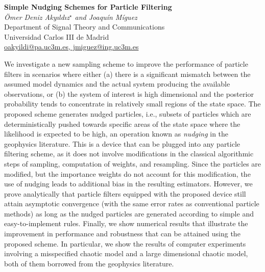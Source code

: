 \documentclass[12pt]{article}
\newcommand{\postertitle}[1]{{\Large\bf #1}\\[12pt]}
\newcommand{\authors}[1]{\emph{#1}\\}
\newcommand{\affiliations}[1]{{#1}\\}
\newcommand{\contacts}[1]{{#1}}
\begin{document}
\begin{center}
\vspace*{0.5cm}
%
\postertitle{Simple Nudging Schemes for Particle Filtering}
%
\authors{\"Omer Deniz Aky{\i}ld{\i}z$^\star$ and Joaqu\'in M\'iguez} %
% 
\affiliations{Department of Signal Theory and Communications \\ Universidad Carlos III de Madrid}
%
\contacts{\url{oakyildi@pa.uc3m.es, jmiguez@ing.uc3m.es}} %
%
\vspace*{0.3cm}
\end{center}

We investigate a new sampling scheme to improve the performance of particle filters in scenarios where either 
(a) there is a significant mismatch between the assumed model dynamics and the actual system producing the available observations, or (b) the system of interest is high dimensional and the posterior probability tends to concentrate in relatively small regions of the state space. The proposed scheme generates nudged particles, i.e., subsets of particles which are deterministically pushed towards specific areas of the state space where the likelihood is expected to be high, an operation known as \textit{nudging} in the geophysics literature. This is a device that can be plugged into any particle filtering scheme, as it does not involve modifications in the classical algorithmic steps of sampling, computation of weights, and resampling. Since the particles are modified, but the importance weights do not account for this modification, the use of nudging leads to additional bias in the resulting estimators. However, we prove analytically that particle filters equipped with the proposed device still attain asymptotic convergence (with the same error rates as conventional particle methods) as long as the nudged particles are generated according to simple and easy-to-implement rules. Finally, we show numerical results that illustrate the improvement in performance and robustness that can be attained using the proposed scheme. In particular, we show the results of computer experiments involving a misspecified chaotic model and a large dimensional chaotic model, both of them borrowed from the geophysics literature.


\end{document}
